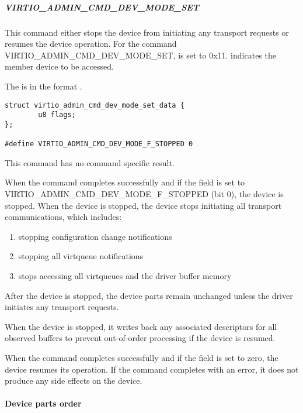 \subparagraph{VIRTIO_ADMIN_CMD_DEV_MODE_SET}\label{par:Basic Facilities of a Virtio Device / Device groups / Group administration commands / Device parts / Device parts handling commands / VIRTIO-ADMIN-CMD-DEV-MODE-SET}

This command either stops the device from initiating any transport requests or
resumes the device operation. For the command VIRTIO_ADMIN_CMD_DEV_MODE_SET,
 is set to 0x11.  indicates the member
device to be accessed.

The  is in the format
.

\begin{lstlisting}
struct virtio_admin_cmd_dev_mode_set_data {
        u8 flags;
};

#define VIRTIO_ADMIN_CMD_DEV_MODE_F_STOPPED 0
\end{lstlisting}

This command has no command specific result.

When the command completes successfully and if the  field is set
to VIRTIO_ADMIN_CMD_DEV_MODE_F_STOPPED (bit 0), the device is stopped.
When the device is stopped, the device stops initiating all transport
communications, which includes:

\begin{enumerate}
\item stopping configuration change notifications
\item stopping all virtqueue notifications
\item stops accessing all virtqueues and the driver buffer memory
\end{enumerate}

After the device is stopped, the device parts remain unchanged unless
the driver initiates any transport requests.

When the device is stopped, it writes back any associated descriptors for all
observed buffers to prevent out-of-order processing if the device is resumed.

When the command completes successfully and if the  field
is set to zero, the device resumes its operation. If the command completes
with an error, it does not produce any side effects on the device.

\paragraph{Device parts order}\label{par:Basic Facilities of a Virtio Device / Device groups / Group administration commands / Device parts / Device parts order}

